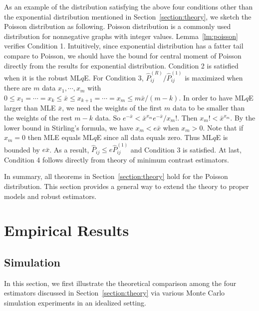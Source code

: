 \documentclass[a4paper]{article}
\renewcommand{\hat}{\widehat}
\begin{document}
As an example of the distribution satisfying the above four conditions other than the exponential distribution mentioned in Section~\ref{section:theory}, we sketch the Poisson distribution as following. Poisson distribution is a commonly used distribution for nonnegative graphs with integer values. Lemma~\ref{lm:poisson} verifies Condition 1. Intuitively, since exponential distribution has a fatter tail compare to Poisson, we should have the bound for central moment of Poisson directly from the results for exponential distribution. Condition 2 is satisfied when it is the robust ML$q$E. For Condition 3, $\hat{P}^{(R)}_{ij}/\hat{P}^{(1)}_{ij}$ is maximized when there are $m$ data $x_1, \cdots, x_m$ with $0 \le x_1 = \cdots = x_k \le \bar{x} \le x_{k+1} = \cdots = x_m \le m \bar{x}/(m - k)$. In order to have ML$q$E larger than MLE $\bar{x}$, we need the weights of the first $m$ data to be smaller than the weights of the rest $m - k$ data. So $e^{-\bar{x}} < \bar{x}^{x_m} e^{-\bar{x}} / x_m!$. Then $x_m! < \bar{x}^{x_m}$. By the lower bound in Stirling's formula, we have $x_m < e \bar{x}$ when $x_m > 0$. Note that if $x_m = 0$ then MLE equals ML$q$E since all data equals zero. Thus ML$q$E is bounded by $e \bar{x}$. As a result, $\hat{P}_{ij} \le e \hat{P}_{ij}^{(1)}$ and Condition 3 is satisfied. At last, Condition 4 follows directly from theory of minimum contrast estimators.

In summary, all theorems in Section~\ref{section:theory} hold for the Poisson distribution. This section provides a general way to extend the theory to proper models and robust estimators.


\section{Empirical Results}
\label{section:results}

\subsection{Simulation}
\label{section:sim}

In this section, we first illustrate the theoretical comparison among the four estimators discussed in Section~\ref{section:theory} via various Monte Carlo simulation experiments in an idealized setting.
\end{document}
